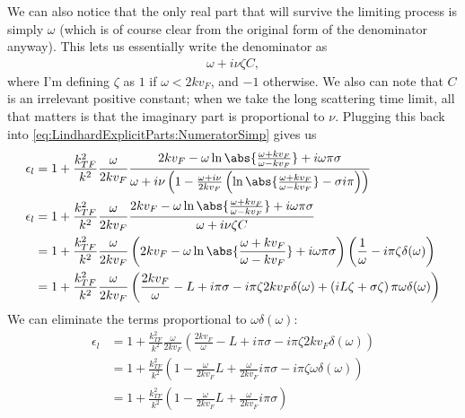 \documentclass[../../main.tex]{subfiles}
\newcommand{\vf}{v_F}
\begin{document}
We can also notice that the only real part that will survive the limiting process is simply $\omega$ (which is of course clear from the original form of the denominator anyway). This lets us essentially write the denominator as 
\begin{align}
	\omega + i \nu \zeta C,
\end{align}
where I'm defining $\zeta$ as $1$ if $\omega < 2k\vf$, and $-1$ otherwise. We also can note that $C$ is an irrelevant positive constant; when we take the long scattering time limit, all that matters is that the imaginary part is proportional to $\nu$. Plugging this back into \eqref{eq:LindhardExplicitParts:NumeratorSimp} gives us 
\begin{align}
	\epsilon_l &= 1 + \frac{k_{TF}^2}{k^2} \frac{\omega}{2 k \vf} \frac{ 2 k\vf - \omega \ln\abs{\frac{\omega + k\vf}{\omega - k\vf}} + i \omega \pi \sigma}{\omega + i \nu\left( 1 - \frac{\omega + i \nu}{2 k\vf} \left(\ln\abs{\frac{\omega + k\vf}{\omega - k\vf}} - \sigma i \pi\right)\right)} \\
	\epsilon_l &=  1 + \frac{k_{TF}^2}{k^2} \frac{\omega}{2 k \vf} \frac{ 2 k\vf - \omega \ln\abs{\frac{\omega + k\vf}{\omega - k\vf}} + i \omega\pi \sigma}{\omega + i \nu \zeta C}  \\
	&= 1 + \frac{k_{TF}^2}{k^2} \frac{\omega}{2 k \vf} \left( 2 k\vf - \omega \ln\abs{\frac{\omega + k\vf}{\omega - k\vf}} + i \omega \pi \sigma\right)\left(\frac{1}{\omega} - i \pi \zeta \delta(\omega) \right) \\
	&= 1 + \frac{k_{TF}^2}{k^2} \frac{\omega}{2 k \vf} \left( \frac{2k\vf}{\omega}- L + i \pi \sigma - i \pi \zeta 2 k \vf \delta(\omega)  +\left( i  L \zeta + \sigma \zeta\right) \pi \omega \delta(\omega)\right)
\end{align}
We can eliminate the terms proportional to $\omega \delta(\omega)$:
\begin{align}
	\epsilon_l 	&= 1 + \frac{k_{TF}^2}{k^2} \frac{\omega}{2 k \vf} \left( \frac{2k\vf}{\omega}- L + i \pi \sigma - i \pi \zeta 2 k \vf \delta(\omega) \right) \\
	&= 1 + \frac{k_{TF}^2}{k^2} \left( 1 -\frac{\omega}{2 k \vf} L + \frac{\omega}{2 k \vf} i\pi \sigma - i \pi \zeta\omega \delta(\omega) \right) \\
	&= 1 + \frac{k_{TF}^2}{k^2} \left( 1 -\frac{\omega}{2 k \vf} L + \frac{\omega}{2 k \vf} i \pi\sigma  \right) 
\end{align}
\end{document}
